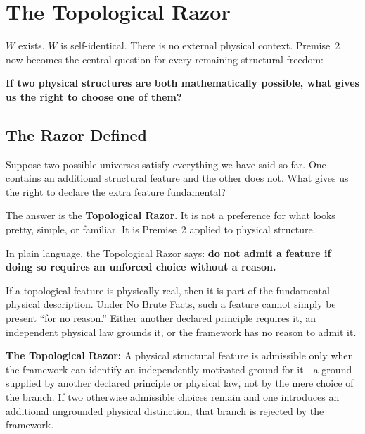 \documentclass[11pt]{article}
\theoremstyle{canonstyle}
\begin{document}
\newpage
\section{The Topological Razor}

$W$ exists. $W$ is self-identical. There is no external physical context. Premise~2 now becomes the central question for every remaining structural freedom:

\begin{center}
\textbf{If two physical structures are both mathematically possible, what gives us the right to choose one of them?}
\end{center}

\subsection{The Razor Defined}

\begin{reflect}
Suppose two possible universes satisfy everything we have said so far. One contains an additional structural feature and the other does not. What gives us the right to declare the extra feature fundamental?
\end{reflect}

The answer is the \textbf{Topological Razor}. It is not a preference for what looks pretty, simple, or familiar. It is Premise~2 applied to physical structure.

In plain language, the Topological Razor says: \textbf{do not admit a feature if doing so requires an unforced choice without a reason.}

If a topological feature is physically real, then it is part of the fundamental physical description. Under No Brute Facts, such a feature cannot simply be present ``for no reason.'' Either another declared principle requires it, an independent physical law grounds it, or the framework has no reason to admit it.

\begin{keyresult}
\textbf{The Topological Razor:} A physical structural feature is admissible only when the framework can identify an independently motivated ground for it---a ground supplied by another declared principle or physical law, not by the mere choice of the branch. If two otherwise admissible choices remain and one introduces an additional ungrounded physical distinction, that branch is rejected by the framework.
\end{keyresult}
\end{document}
